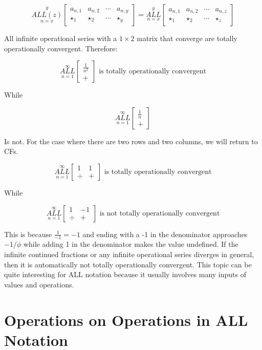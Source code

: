 \documentclass{article}
\begin{document}
$$\underset{n=x}{\overset{y}{ALL(z)}} \begin{bmatrix}
a_{n,1} & a_{n,2} & \cdots & a_{n,y} \\
\star_1 & \star_2 & \cdots & \star_y
\end{bmatrix} = \underset{n=x}{\overset{y}{ALL}} \begin{bmatrix}
a_{n,1} & a_{n,2} & \cdots & a_{n,z} \\
\star_1 & \star_2 & \cdots & \star_z
\end{bmatrix}$$

All infinite operational series with a $1 \times 2$ matrix that converge are totally operationally convergent. Therefore:

$$\underset{n=1}{\overset{\infty}{ALL}} \begin{bmatrix}
\frac{1}{n^2} \\
+
\end{bmatrix} \text{ is totally operationally convergent}
$$

While

$$\underset{n=1}{\overset{\infty}{ALL}} \begin{bmatrix}
\frac{1}{n} \\
+
\end{bmatrix}$$

Is not. For the case where there are two rows and two columns, we will return to CFs.

$$\underset{n=1}{\overset{\infty}{ALL}} \begin{bmatrix}
1 & 1 \\
\div & +
\end{bmatrix} \text{ is totally operationally convergent}$$

While

$$\underset{n=1}{\overset{\infty}{ALL}} \begin{bmatrix}
1 & -1 \\
\div & +
\end{bmatrix} \text{ is not totally operationally convergent}$$

This is because $\frac{1}{-1}=-1$ and ending with a -1 in the denominator approaches $-1/\phi$ while adding 1 in the denominator makes the value undefined. If the infinite continued fractions or any infinite operational series diverges in general, then it is automatically not totally operationally convergent. This topic can be quite interesting for ALL notation because it usually involves many inputs of values and operations.

\section{Operations on Operations in ALL Notation}
\end{document}
